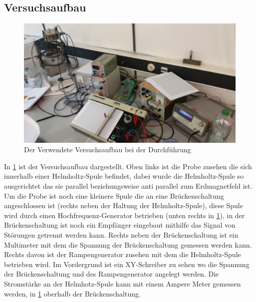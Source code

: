 \subsection{Versuchsaufbau}
\begin{figure}[h!]
\centering
\includegraphics[width=\textwidth]{../Grafiken/Aufbau.jpg}
\caption{Der Verwendete Versuchsaufbau bei der Durchführung}\label{fig:Aufbau}
\end{figure}
In \cref{fig:Aufbau} ist der Versuchsaufbau dargestellt. Oben links ist die Probe zusehen die sich innerhalb einer Helmholtz-Spule befindet, dabei wurde die Helmholtz-Spule so ausgerichtet das sie parallel beziehungsweise anti parallel zum Erdmagnetfeld ist. Um die Probe ist noch eine kleinere Spule die an eine Brückenschaltung angeschlossen ist (rechts neben der Haltung der Helmholtz-Spule), diese Spule wird durch einen Hochfrequenz-Generator betrieben (unten rechts in \cref {fig:Aufbau}), in der Brückenschaltung ist noch ein Empfänger eingebaut mithilfe das Signal von Störungen getrennt werden kann. Rechts neben der Brückenschaltung ist ein Multimeter mit dem die Spannung der Brückenschaltung gemessen werden kann. Rechts davon ist der Rampengenerator zusehen mit dem die Helmholtz-Spule betrieben wird. Im Vordergrund ist ein XY-Schreiber zu sehen wo die Spannung der Brückenschaltung und des Rampengenerator angelegt werden. Die Stromstärke an der Helmhotz-Spule kann mit einem Ampere Meter gemessen werden, in 	\ref{fig:Aufbau} oberhalb der Brückenschaltung.
